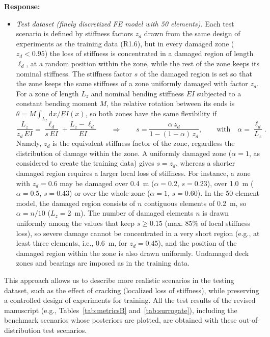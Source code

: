 \documentclass[11pt]{article}
\newenvironment{response}{\par\smallskip\noindent\color{resp}\textbf{Response:}\ }{\par}
\begin{document}
\begin{response}
\begin{itemize}[leftmargin=*]
\item \emph{Test dataset (finely discretized FE model with 50 elements).} Each test scenario is defined by stiffness factors $z_d$ drawn from the same design of experiments as the training data (R1.6), but in every damaged zone ($z_d<0.95$) the loss of stiffness is concentrated in a damaged region of length $\ell_d$, at a random position within the zone, while the rest of the zone keeps its nominal stiffness.
The stiffness factor $s$ of the damaged region is set so that the zone keeps the same stiffness of a zone uniformly damaged with factor $z_d$.
For a zone of length $L_z$ and nominal bending stiffness $EI$ subjected to a constant bending moment $M$, the relative rotation between its ends is $\theta=M\int_{L_z}\mathrm{d}x/EI(x)$, so both zones have the same flexibility if
\begin{equation}
\frac{L_z}{z_d\,EI}=\frac{\ell_d}{s\,EI}+\frac{L_z-\ell_d}{EI}
\qquad\Longrightarrow\qquad
s=\frac{\alpha\,z_d}{1-(1-\alpha)\,z_d},\qquad\text{with}\quad\alpha=\frac{\ell_d}{L_z}.
\label{eq:localized}
\end{equation}
Namely, $z_d$ is the equivalent stiffness factor of the zone, regardless the distribution of damage within the zone.
A uniformly damaged zone ($\alpha=1$, as considered to create the training data) gives $s=z_d$, whereas a shorter damaged region requires a larger local loss of stiffness.
For instance, a zone with $z_d=0.6$ may be damaged over 0.4~m ($\alpha=0.2$, $s=0.23$), over 1.0~m ($\alpha=0.5$, $s=0.43$) or over the whole zone ($\alpha=1$, $s=0.60$).
In the 50-element model, the damaged region consists of $n$ contiguous elements of 0.2~m, so $\alpha=n/10$ ($L_z=2$~m).
The number of damaged elements $n$ is drawn uniformly among the values that keep $s\ge0.15$ (max. 85\% of local stiffness loss), so severe damage cannot be concentrated in a very short region (e.g., at least three elements, i.e., 0.6~m, for $z_d=0.45$), and the position of the damaged region within the zone is also drawn uniformly.
Undamaged deck zones and bearings are imposed as in the training data.
\end{itemize}
This approach allows us to describe more realistic scenarios in the testing dataset, such as the effect of cracking
(localized loss of stiffness), while preserving a controlled design of experiments for training. All the test results
of the revised manuscript (e.g., Tables~\ref{tab:metricsB} and~\ref{tab:surrogate}), including the benchmark scenarios
whose posteriors are plotted, are obtained with these out-of-distribution test scenarios.
\end{response}
\end{document}
